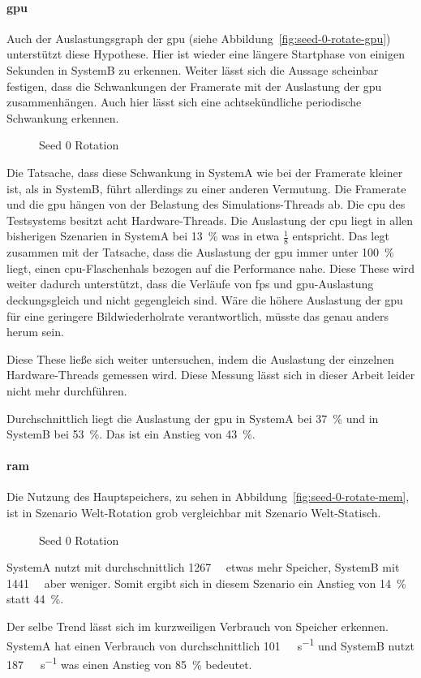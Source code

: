 \paragraph{\ac{gpu}}
Auch der Auslastungsgraph der \ac{gpu} (siehe Abbildung~\vref{fig:seed-0-rotate-gpu}) unterstützt diese Hypothese. Hier ist wieder eine längere Startphase von einigen Sekunden in SystemB zu erkennen. Weiter lässt sich die Aussage scheinbar festigen, dass die Schwankungen der Framerate mit der Auslastung der \ac{gpu} zusammenhängen. Auch hier lässt sich eine achtsekündliche periodische Schwankung erkennen.
\begin{figure}[!htbp]
	\caption{Seed 0 Rotation}\label{fig:seed-0-rotate-gpu}
\end{figure}
Die Tatsache, dass diese Schwankung in SystemA wie bei der Framerate kleiner ist, als in SystemB, führt allerdings zu einer anderen Vermutung. Die Framerate und die \ac{gpu} hängen von der Belastung des Simulations-Threads ab. Die \ac{cpu} des Testsystems besitzt acht Hardware-Threads. Die Auslastung der \ac{cpu} liegt in allen bisherigen Szenarien in SystemA bei \SI{13}{\percent} was in etwa $\frac{1}{8}$ entspricht. Das legt zusammen mit der Tatsache, dass die Auslastung der \ac{gpu} immer unter \SI{100}{\percent} liegt, einen \ac{cpu}-Flaschenhals bezogen auf die Performance nahe. Diese These wird weiter dadurch unterstützt, dass die Verläufe von \ac{fps} und \ac{gpu}-Auslastung deckungsgleich und nicht gegengleich sind. Wäre die höhere Auslastung der \ac{gpu} für eine geringere Bildwiederholrate verantwortlich, müsste das genau anders herum sein.

Diese These ließe sich weiter untersuchen, indem die Auslastung der einzelnen Hardware-Threads gemessen wird. Diese Messung lässt sich in dieser Arbeit leider nicht mehr durchführen. 

Durchschnittlich liegt die Auslastung der \ac{gpu} in SystemA bei \SI{37}{\percent} und in SystemB bei \SI{53}{\percent}. Das ist ein Anstieg von \SI{43}{\percent}.

\paragraph{\ac{ram}}
Die Nutzung des Hauptspeichers, zu sehen in Abbildung~\vref{fig:seed-0-rotate-mem}, ist in Szenario Welt-Rotation grob vergleichbar mit Szenario Welt-Statisch.
\begin{figure}[!htbp]
	\caption{Seed 0 Rotation}\label{fig:seed-0-rotate-mem}	
\end{figure} 
SystemA nutzt mit durchschnittlich \SI{1267}{\mega\byte} etwas mehr Speicher, SystemB mit \SI{1441}{\mega\byte} aber weniger. Somit ergibt sich in diesem Szenario ein Anstieg von \SI{14}{\percent} statt \SI{44}{\percent}. 

Der selbe Trend lässt sich im kurzweiligen Verbrauch von Speicher erkennen. SystemA hat einen Verbrauch von durchschnittlich \SI{101}{\mega\byte\per\second} und SystemB nutzt \SI{187}{\mega\byte\per\second} was einen Anstieg von \SI{85}{\percent} bedeutet.
